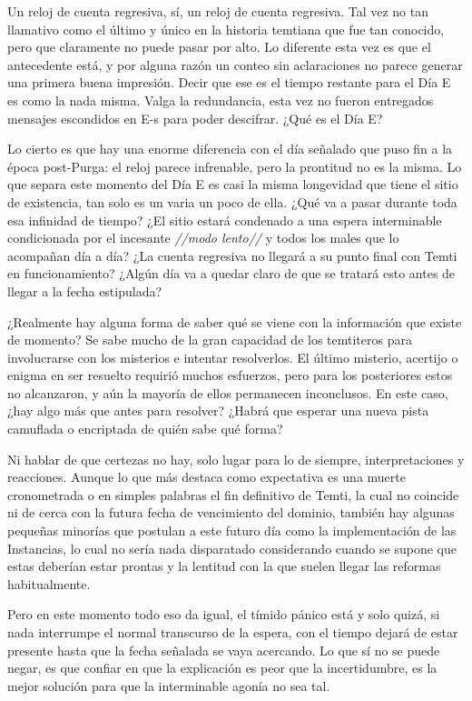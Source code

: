 \documentclass[
  spanish,
]{book}
\begin{document}
Un reloj de cuenta regresiva, sí, un reloj de cuenta regresiva.
Tal vez no tan llamativo como el último y único en la historia temtiana que fue tan conocido, pero que claramente no puede pasar por alto. Lo diferente esta vez es que el antecedente está, y por alguna razón un conteo sin aclaraciones no parece generar una primera buena impresión. Decir que ese es el tiempo restante para el Día E es como la nada misma. Valga la redundancia, esta vez no fueron entregados mensajes escondidos en E-s para poder descifrar. ¿Qué es el Día E?

Lo cierto es que hay una enorme diferencia con el día señalado que puso fin a la época post-Purga: el reloj parece infrenable, pero la prontitud no es la misma. Lo que separa este momento del Día E es casi la misma longevidad que tiene el sitio de existencia, tan solo es un varia un poco de ella. ¿Qué va a pasar durante toda esa infinidad de tiempo? ¿El sitio estará condenado a una espera interminable condicionada por el incesante \emph{//modo lento//} y todos los males que lo acompañan día a día? ¿La cuenta regresiva no llegará a su punto final con Temti en funcionamiento? ¿Algún día va a quedar claro de que se tratará esto antes de llegar a la fecha estipulada?

¿Realmente hay alguna forma de saber qué se viene con la información que existe de momento?
Se sabe mucho de la gran capacidad de los temtiteros para involucrarse con los misterios e intentar resolverlos. El último misterio, acertijo o enigma en ser resuelto requirió muchos esfuerzos, pero para los posteriores estos no alcanzaron, y aún la mayoría de ellos permanecen inconclusos. En este caso, ¿hay algo más que antes para resolver? ¿Habrá que esperar una nueva pista camuflada o encriptada de quién sabe qué forma?

Ni hablar de que certezas no hay, solo lugar para lo de siempre, interpretaciones y reacciones.
Aunque lo que más destaca como expectativa es una muerte cronometrada o en simples palabras el fin definitivo de Temti, la cual no coincide ni de cerca con la futura fecha de vencimiento del dominio, también hay algunas pequeñas minorías que postulan a este futuro día como la implementación de las Instancias, lo cual no sería nada disparatado considerando cuando se supone que estas deberían estar prontas y la lentitud con la que suelen llegar las reformas habitualmente.

Pero en este momento todo eso da igual, el tímido pánico está y solo quizá, si nada interrumpe el normal transcurso de la espera, con el tiempo dejará de estar presente hasta que la fecha señalada se vaya acercando. Lo que sí no se puede negar, es que confiar en que la explicación es peor que la incertidumbre, es la mejor solución para que la interminable agonía no sea tal.
\end{document}
